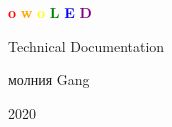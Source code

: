 \begin{titlepage}
\vspace*{\fill}
\begin{center}
\Huge{
\textbf{\textcolor{red}{o}}
\textbf{\textcolor{orange}{w}}
\textbf{\textcolor{yellow}{o}}
\textbf{\textcolor{green}{L}}
\textbf{\textcolor{blue}{E}}
\textbf{\textcolor{purple}{D}}
}

\Huge{Technical Documentation}

\vspace{1em}

\LARGE{молния Gang}

\vspace{0.5em}

\Large{2020}
\end{center}
\vspace*{\fill}
\end{titlepage}
